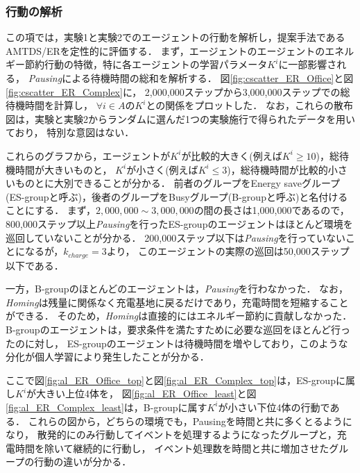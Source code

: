 \documentclass[12pt,a4j,twoside]{jarticle}
\def\AgentSet{A}
\begin{document}
  \subsubsection{行動の解析}\label{sec:expAnalsis}
  この項では，実験1と実験2でのエージェントの行動を解析し，提案手法であるAMTDS/ERを定性的に評価する．
  まず，エージェントのエージェントのエネルギー節約行動の特徴，特に各エージェントの学習パラメータ$K^i$に一部影響される，
  {\em Pausing}による待機時間の総和を解析する．
  図\ref{fig:cscatter_ER_Office}と図\ref{fig:cscatter_ER_Complex}に，
  2,000,000ステップから3,000,000ステップでの総待機時間を計算し，
  $\forall i\in\AgentSet$の$K^i$との関係をプロットした．
  なお，これらの散布図は，実験と実験2からランダムに選んだ1つの実験施行で得られたデータを用いており，
  特別な意図はない．
  \par

  これらのグラフから，エージェントが$K^i$が比較的大きく(例えば$K^i\geq 10$)，総待機時間が大きいものと，
  $K^i$が小さく(例えば$K^i\leq 3$)，総待機時間が比較的小さいものとに大別できることが分かる．
  前者のグループをEnergy saveグループ(ES-groupと呼ぶ)，後者のグループをBusyグループ(B-groupと呼ぶ)と名付けることにする．
  まず，$2,000,000 \sim 3,000,000$の間の長さは1,000,000であるので，
  800,000ステップ以上{\em Pausing}を行ったES-groupのエージェントはほとんど環境を巡回していないことが分かる．
  200,000ステップ以下は{\em Pausing}を行っていないことになるが，$k_{charge} = 3$より，
  このエージェントの実際の巡回は50,000ステップ以下である．
  \par

  一方，B-groupのほとんどのエージェントは，{\em Pausing}を行わなかった．
  なお，{\em Homing}は残量に関係なく充電基地に戻るだけであり，充電時間を短縮することができる．
  そのため，{\em Homing}は直接的にはエネルギー節約に貢献しなかった．
  B-groupのエージェントは，要求条件を満たすために必要な巡回をほとんど行ったのに対し，
  ES-groupのエージェントは待機時間を増やしており，このような分化が個人学習により発生したことが分かる．
  \par

  ここで図\ref{fig:al_ER_Office_top}と図\ref{fig:al_ER_Complex_top}は，ES-groupに属し$K^i$が大きい上位4体を，
  図\ref{fig:al_ER_Office_least}と図\ref{fig:al_ER_Complex_least}は，B-groupに属す$K^i$が小さい下位4体の行動である．
  これらの図から，どちらの環境でも，Pausingを時間と共に多くとるようになり，
  散発的にのみ行動してイベントを処理するようになったグループと，充電時間を除いて継続的に行動し，
  イベント処理数を時間と共に増加させたグループの行動の違いが分かる．
  \par
\end{document}
